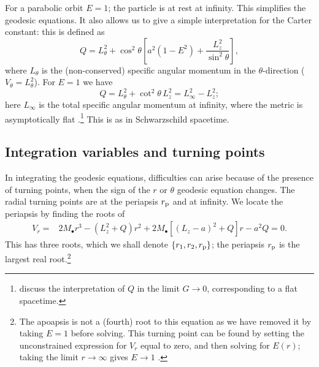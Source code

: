 For a parabolic orbit $E = 1$; the particle is at rest at infinity. This simplifies the geodesic equations. It also allows us to give a simple interpretation for the Carter constant: this is defined as
\begin{equation}
Q = L_\theta^2 + \cos^2\theta\left[a^2\left(1 - E^2\right) + \frac{L_z^2}{\sin^2\theta}\right],
\end{equation}
where $L_\theta$ is the (non-conserved) specific angular momentum in the $\theta$-direction ($V_\theta = L_\theta^2$). For $E = 1$ we have
\begin{equation}
Q = L_\theta^2 + \cot^2\theta\, L_z^2 = L_\infty^2 - L_z^2;
\end{equation}
here $L_\infty$ is the total specific angular momentum at infinity, where the metric is asymptotically flat \citep{DeFelice1980}.\footnote{\citet{Rosquist2009} discuss the interpretation of $Q$ in the limit $G \rightarrow 0$, corresponding to a flat spacetime.} This is as in Schwarzschild spacetime.

\subsection{Integration variables and turning points}

In integrating the geodesic equations, difficulties can arise because of the presence of turning points, when the sign of the $r$ or $\theta$ geodesic equation changes. The radial turning points are at the periapsis $r_\mathrm{p}$ and at infinity. We locate the periapsis by finding the roots of
\begin{align}
V_r = {} & 2M_\bullet r^3 - \left(L_z^2+Q\right)r^2 + 2M_\bullet\left[\left(L_z - a\right)^2 + Q\right]r - a^2 Q = {} 0.
\end{align}
This has three roots, which we shall denote $\{r_1, r_2, r_\mathrm{p}\}$; the periapsis $r_\mathrm{p}$ is the largest real root.\footnote{The apoapsis is not a (fourth) root to this equation as we have removed it by taking $E = 1$ before solving. This turning point can be found by setting the unconstrained expression for $V_r$ equal to zero, and then solving for $E(r)$; taking the limit $r \rightarrow \infty$ gives $E \rightarrow 1$ \citep{Wilkins1972}.}

